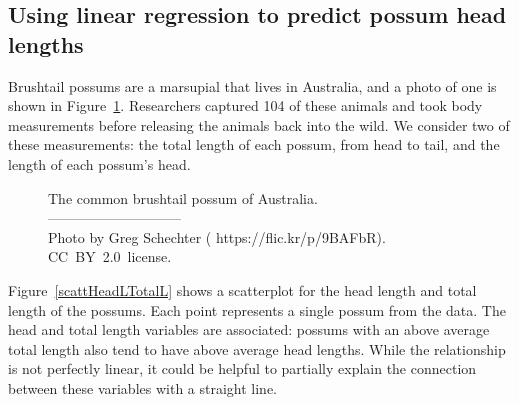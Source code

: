 \subsection{Using linear regression to predict possum head lengths}


Brushtail possums are a marsupial that lives in Australia,
and a photo of one is shown in
Figure~\ref{brushtail_possum}.
Researchers captured 104 of these animals and took body
measurements before releasing the animals back into the wild.
We consider two of these measurements:
the total length of each possum, from head to tail,
and the length of each possum's head.

\setlength{\captionwidth}{0.83\mycaptionwidth}
\begin{figure}[h]
  \centering
  \caption{The common brushtail possum of Australia.\vspace{-1mm} \\
      -----------------------------\vspace{-2mm}\\
      {\footnotesize Photo by Greg Schechter
      (
          {https://flic.kr/p/9BAFbR}).
          {CC~BY~2.0~license}.}}
  \label{brushtail_possum}
\end{figure}
\setlength{\captionwidth}{\mycaptionwidth}

Figure~\ref{scattHeadLTotalL} shows a scatterplot for the head
length and total length of the possums.
Each point represents a single possum from the data.
The head and total length variables are associated:
possums with an above average total length also tend to have
above average head lengths.
While the relationship is not perfectly linear, it could
be helpful to partially explain the connection between these
variables with a straight line.

\D{\newpage}

